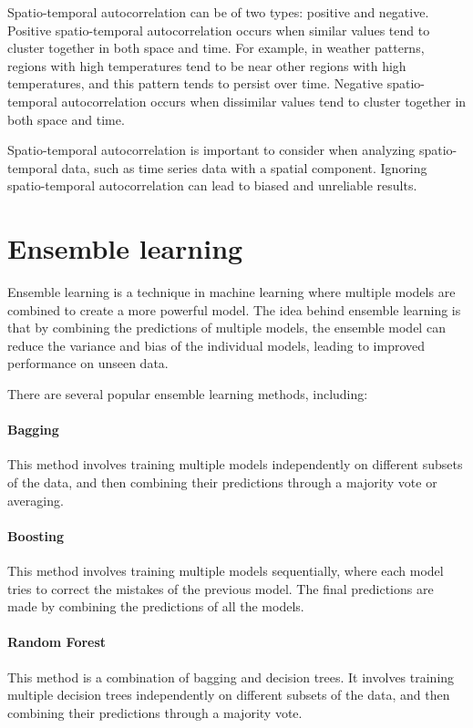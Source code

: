 Spatio-temporal autocorrelation can be of two types: positive and negative. 
Positive spatio-temporal autocorrelation occurs when similar values tend to cluster together in both space and time. 
For example, in weather patterns, regions with high temperatures tend to be near other regions with high temperatures, and this pattern tends to persist over time. 
Negative spatio-temporal autocorrelation occurs when dissimilar values tend to cluster together in both space and time.

Spatio-temporal autocorrelation is important to consider when analyzing spatio-temporal data, such as time series data with a spatial component.
Ignoring spatio-temporal autocorrelation can lead to biased and unreliable results.

\section{Ensemble learning}
Ensemble learning \cite{Ho2009, Sklansky2013} is a technique in machine learning where multiple models are combined to create a more powerful model.
The idea behind ensemble learning is that by combining the predictions of multiple models, the ensemble model can reduce the variance and bias of the individual models, leading to improved performance on unseen data.

There are several popular ensemble learning methods, including:

\paragraph{Bagging} This method involves training multiple models independently on different subsets of the data, and then combining their predictions through a majority vote or averaging.

\paragraph{Boosting} This method involves training multiple models sequentially, where each model tries to correct the mistakes of the previous model. The final predictions are made by combining the predictions of all the models.

\paragraph{Random Forest} This method is a combination of bagging and decision trees. It involves training multiple decision trees independently on different subsets of the data, and then combining their predictions through a majority vote.

